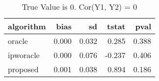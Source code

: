 \begin{table}[h!]

\caption{True Value is 0. Cor(Y1, Y2) = 0}
\centering
\begin{tabular}[t]{lrrrr}
\toprule
algorithm & bias & sd & tstat & pval\\
\midrule
oracle & 0.000 & 0.032 & 0.285 & 0.388\\
ipworacle & 0.000 & 0.076 & -0.237 & 0.406\\
proposed & 0.001 & 0.038 & 0.894 & 0.186\\
\bottomrule
\end{tabular}
\end{table}
